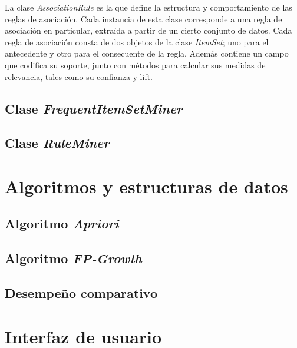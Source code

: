 La clase \textit{AssociationRule} es la que define la estructura y comportamiento de las reglas de asociación. Cada instancia de esta clase corresponde a una regla de asociación en particular, extraída a partir de un cierto conjunto de datos. Cada regla de asociación consta de dos objetos de la clase \textit{ItemSet}; uno para el antecedente y otro para el consecuente de la regla. Además contiene un campo que codifica su soporte, junto con métodos para calcular sus medidas de relevancia, tales como su confianza y lift.

\subsection{Clase \textit{FrequentItemSetMiner}}

\subsection{Clase \textit{RuleMiner}}

\section{Algoritmos y estructuras de datos}

\subsection{Algoritmo \textit{Apriori}}

\subsection{Algoritmo \textit{FP-Growth}}

\subsection{Desempeño comparativo}

\section{Interfaz de usuario}